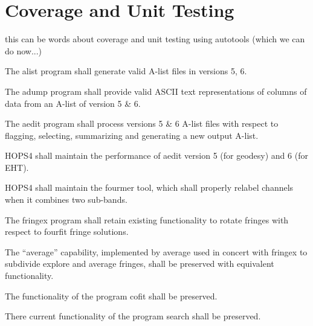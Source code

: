 %
%
\section{Coverage and Unit Testing}
\label{sec:coverunit}

this can be words about coverage and unit testing using autotools
(which we can do now...)

 The \acs{alist} program shall generate valid \acs{A-list} files in 
versions 5, 6. 

 The \acs{adump} program shall provide valid ASCII text representations 
of columns of data from an \acs{A-list} of version 5 \& 6.

 The \acs{aedit} program shall process versions 5 \& 6 \acs{A-list} 
files with respect to flagging, selecting, summarizing and generating a new 
output \acs{A-list}.

 HOPS4 shall maintain the performance of \acs{aedit} version 5 (for 
geodesy) and 6 (for EHT).

 HOPS4 shall maintain the \acs{fourmer} tool, which shall properly 
relabel channels when it combines two sub-bands.

 The \acs{fringex} program shall retain existing functionality to rotate
fringes with respect to fourfit fringe solutions.

 The ``average'' capability, implemented by \acs{average} used in 
concert with \acs{fringex} to subdivide explore and average fringes, shall be 
preserved with equivalent functionality.

 The functionality of the program \acs{cofit} shall be preserved.

 There current functionality of the program \acs{search} shall be 
preserved.

